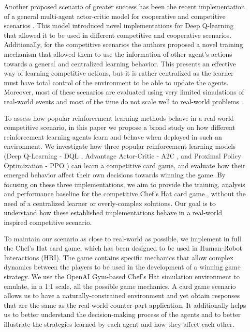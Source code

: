 \documentclass[a4paper,conference]{IEEEtran}
\begin{document}
Another proposed scenario of greater success has been the recent implementation of a general multi-agent actor-critic model for cooperative and competitive scenarios \cite{tampuu2017multiagent}. This model introduced novel implementations for Deep Q-learning that allowed it to be used in different competitive and cooperative scenarios. Additionally, for the competitive scenarios the authors proposed a novel training mechanism that allowed them to use the information of other agent's actions towards a general and centralized learning behavior. This presents an effective way of learning competitive actions, but it is rather centralized as the learner must have total control of the environment to be able to update the agents. Moreover, most of these scenarios are evaluated using very limited simulations of real-world events and most of the time do not scale well to real-world problems \cite{hernandez2019survey}. 

To assess how popular reinforcement learning methods behave in a real-world competitive scenario, in this paper we propose a broad study on how different reinforcement learning agents learn and behave when deployed in such an environment. We investigate how three popular reinforcement learning models (Deep Q-Learning - DQL \cite{van2016deep}, Advantage Actor-Critic - A2C \cite{mnih2016asynchronous}, and Proximal Policy Optimization - PPO \cite{schulman2017proximal}) can learn a competitive card game, and evaluate how their emerged behavior affect their own decisions towards winning the game. By focusing on these three implementations, we aim to provide the training, analysis and performance baseline for the competitive Chef's Hat card game \cite{barros2020food}, without the need of a centralized learner or overly-complex solutions. Our goal is to understand how these established implementations behave in a real-world inspired competitive scenario.

To maintain our scenario as close to real-world as possible, we implement in full the Chef's Hat card game, which has been designed to be used in Human-Robot Interactions (HRI). The game contains specific mechanics that allow complex dynamics between the players to be used in the development of a winning game strategy. We use the OpenAI Gym-based Chef's Hat simulation environment \cite{barros2020chef} to emulate, in a 1:1 scale, all the possible game mechanics. A card game scenario allows us to have a naturally-constrained environment and yet obtain responses that are the same as the real-world counter-part application. It additionally helps us to better understand the decision-making process of the agents and to better illustrate the strategies learned by each agent and how they affect each other.
\end{document}
